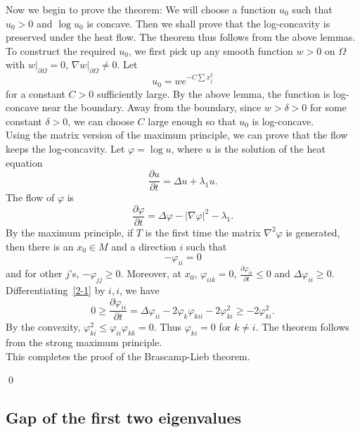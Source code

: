 Now we begin to prove the theorem: We will choose a function $u_0$ such that
$u_0 > 0$ and $\log u_0$ is concave. Then we shall prove that the log-concavity
is preserved under the heat flow. The theorem thus follows from the above
lemmas.
\\

To construct the required $u_0$, we first pick up any smooth function $w>0$ on
$\Omega$ with $w|_{\partial\Omega} = 0$, $\nabla w|_{\partial \Omega} \neq 0$.
Let
\[
u_0 = w e^{-C\sum x_j^2}
\]
for a constant $C > 0$ sufficiently large. By the above lemma, the function is 
log-concave near the boundary. Away from the boundary, since $w > \delta > 0$
for some constant $\delta > 0$, we can choose $C$ large enough so that $u_0$ is
log-concave.
\\

Using the matrix version of the maximum principle, we can prove that the flow
keeps the log-concavity. Let $\varphi = \log u$, where $u$ is the solution of
the heat equation
\[
\frac{\partial u}{\partial t} = \Delta u + \lambda_1 u.
\]
The flow of $\varphi$ is
\begin{equation}\label{2-1}
\frac{\partial\varphi}{\partial t} = \Delta\varphi - |\nabla\varphi|^2 - 
\lambda_1.
\end{equation}
By the maximum principle, if $T$ is the first time the matrix $\nabla^2\varphi$
is generated, then there is an $x_0\in M$ and a direction $i$ such that
\[
-\varphi_{ii} = 0
\]
and for other $j$'s, $-\varphi_{jj} \geqslant 0$. Moreover, at $x_0$,
$\varphi_{iik} = 0$, $\frac{\partial\varphi_{ii}}{\partial t} \leqslant 0$ and
$\Delta\varphi_{ii} \geqslant 0$.
\\

Differentiating~\eqref{2-1}  by $i,i$, we have
\[
0 \geqslant \frac{\partial\varphi_{ii}}{\partial t} = \Delta\varphi_{ii} - 
2\varphi_k\varphi_{kii} - 2\varphi_{ki}^2 \geqslant -2\varphi_{ki}^2.
\]
By the convexity, $\varphi_{ki}^2 \leqslant \varphi_{ii}\varphi_{kk} = 0$. Thus
$\varphi_{ki} = 0$ for $k\neq i$. The theorem follows from the strong maximum
principle.
\\

This completes the proof of the Brascamp-Lieb theorem.

\qed

\subsection{Gap of the first two eigenvalues}

